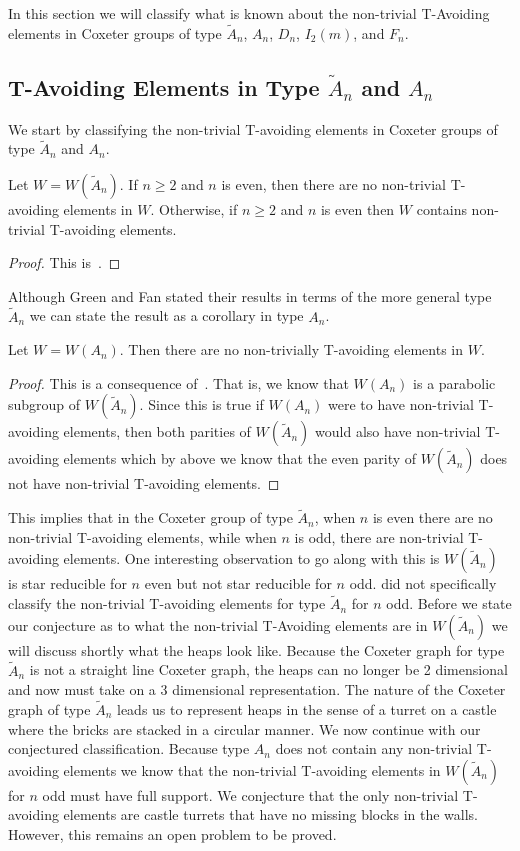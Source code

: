 In this section we will classify what is known about the non-trivial T-Avoiding elements in Coxeter groups of type $\widetilde{A}_n$, $A_n$, $D_n$, $I_2(m)$, and $F_n$.

\subsection{T-Avoiding Elements in Type $\widetilde{A}_n$ and $A_n$}
We start by classifying the non-trivial T-avoiding elements in Coxeter groups of type $\widetilde{A}_n$ and $A_n$. 
\begin{theorem}
Let $W=W(\widetilde{A}_n)$.  If $n \geq 2$ and $n$ is even, then there are no non-trivial T-avoiding elements in $W$. Otherwise, if $n \geq 2$ and $n$ is even then $W$ contains non-trivial T-avoiding elements.
\begin{proof}
	This is~\cite[Proposition~3.1.2.]{Fan1999}.
\end{proof}
\end{theorem}

Although Green and Fan stated their results in terms of the more general type $\widetilde{A}_n$ we can state the result as a corollary in type $A_n$.
\begin{corollary}
Let $W=W(A_n)$. Then there are no non-trivially T-avoiding elements in $W$. 
\begin{proof}
This is a consequence of~\cite[Proposition 3.1.2.]{Fan1999}.	 That is,  we know that $W(A_n)$ is a parabolic subgroup of $W(\widetilde{A}_n)$. Since this is true if $W(A_n)$ were to have non-trivial T-avoiding elements, then both parities of $W(\widetilde{A}_n)$ would also have non-trivial T-avoiding elements which by above we know that the even parity of $W(\widetilde{A}_n)$ does not have non-trivial T-avoiding elements.
\end{proof}
\end{corollary}

This implies that in the Coxeter group of type $\widetilde{A}_n$, when $n$ is even there are no non-trivial T-avoiding elements, while when $n$ is odd, there are non-trivial T-avoiding elements. One interesting observation to go along with this is $W(\widetilde{A}_n)$ is star reducible for $n$ even but not star reducible for $n$ odd. \cite{Fan1999} did not specifically classify the non-trivial T-avoiding elements for type $\widetilde{A}_n$ for $n$ odd. Before we state our conjecture as to what the non-trivial T-Avoiding elements are in $W(\widetilde{A}_n)$ we will discuss shortly what the heaps look like. Because the Coxeter graph for type $\widetilde{A}_n$ is not a straight line Coxeter graph, the heaps can no longer be 2 dimensional and now must take on a 3 dimensional representation. The nature of the Coxeter graph of type $\widetilde{A}_n$ leads us to represent heaps in the sense of a turret on a castle where the bricks are stacked in a circular manner. We now continue with our conjectured classification. Because type $A_n$ does not contain any non-trivial T-avoiding elements we know that the non-trivial T-avoiding elements in $W(\widetilde{A}_n)$ for $n$ odd must have full support. We conjecture that the only non-trivial T-avoiding elements are castle turrets that have no missing blocks in the walls. However, this remains an open problem to be proved.
